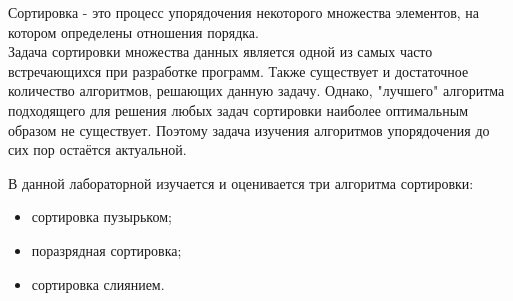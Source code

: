 Сортировка - это процесс упорядочения некоторого множества элементов, на котором определены отношения порядка\cite{sort_def}.\\

Задача сортировки множества данных является одной из самых часто встречающихся при разработке программ. Также существует и достаточное количество алгоритмов, решающих данную задачу. Однако, "лучшего" алгоритма подходящего для решения любых задач сортировки наиболее оптимальным образом не существует. Поэтому задача изучения алгоритмов упорядочения до сих пор остаётся актуальной.

В данной лабораторной изучается и оценивается три алгоритма сортировки:
\begin{itemize}
	\item сортировка пузырьком;
	\item поразрядная сортировка;
	\item сортировка слиянием.
\end{itemize}
